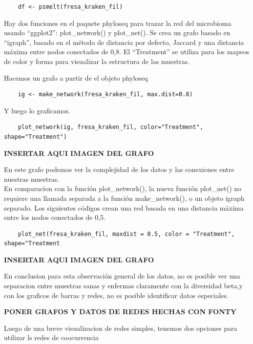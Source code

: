 \begin{lstlisting}
    df <- psmelt(fresa_kraken_fil)
\end{lstlisting}

Hay dos funciones en el paquete phyloseq para trazar la red del microbioma usando “ggplot2”: plot\_network() y plot\_net().
Se crea un grafo basado en “igraph”, basado en el método de distancia por defecto, Jaccard y una distancia
máxima entre nodos conectados de 0,8. El “Treatment” se utiliza para los mapeos de color y forma para
visualizar la estructura de las muestras.

Hacemos un grafo a partir de el objeto phyloseq

\begin{lstlisting}
    ig <- make_network(fresa_kraken_fil, max.dist=0.8)
\end{lstlisting}

Y luego lo graficamos.

\begin{lstlisting}
    plot_network(ig, fresa_kraken_fil, color="Treatment", shape="Treatment")
\end{lstlisting}

\textbf{INSERTAR AQUI IMAGEN DEL GRAFO}

En este grafo podemos ver la complejidad de los datos y las conexiones entre nuestras muestras.\\

En comparacion con la función plot\_network(), la nueva función plot\_net() no requiere una llamada separada a la función make\_network(), o un objeto igraph separado. Los siguientes códigos crean una red basada en una distancia máxima entre los nodos conectados de 0,5.

\begin{lstlisting}
    plot_net(fresa_kraken_fil, maxdist = 0.5, color = "Treatment", shape="Treatment
\end{lstlisting}

\textbf{INSERTAR AQUI IMAGEN DEL GRAFO}

En conclusion para esta observación general de los datos, no es posible ver una separacion entre muestras
sanas y enfermas claramente con la diversidad beta,y con los graficos de barras y redes, no es posible
identificar datos especiales.




\textbf{PONER GRAFOS Y DATOS DE REDES HECHAS CON FONTY}

Luego de una breve visualizacion de redes simples, tenemos dos opciones para utilizar ls redes de coocurrencia

